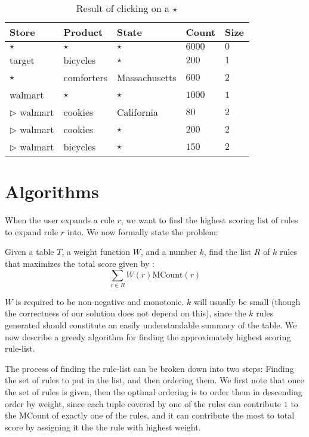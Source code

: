 \documentclass{sig-alternate}
\begin{document}
\begin{table}
\centering
\begin{tabular}{| l | l | l | l | l |}
\hline Store & Product & State & Count & Size \\
\hline
$\star$ & $\star$ & $\star$ & $6000$ & $0$ \\ \cline{1-5}
target & bicycles & $\star$ & $200$ & $1$ \\ \cline{1-5}
$\star$ & comforters & Massachusetts & $600$ & $2$ \\ \cline{1-5}
walmart & $\star$ & $\star$ & $1000$ & $1$ \\ \cline{2-5}
$\triangleright$ walmart & cookies & California & $80$ & $2$ \\ \cline{2-5}
$\triangleright$ walmart & cookies & $\star$ & $200$ & $2$ \\ \cline{2-5}
$\triangleright$ walmart & bicycles & $\star$ & $150$ & $2$ \\  \hline
\end{tabular}
\caption{Result of clicking on a $\star$ \label{table:introexample3}}
\end{table}

\section{Algorithms}
\label{sec:algorithms}
When the user expands a rule $r$, we want to find the highest scoring list of rules to expand rule $r$ into. We now formally state the problem:

Given a table $T$, a weight function $W$, and a number $k$, find the list $R$ of $k$ rules that maximizes the total score given by :
$$\sum_{r \in R}W(r)\text{MCount}(r)$$

$W$ is required to be non-negative and monotonic. $k$ will usually be small (though the correctness of our solution does not depend on this), since the $k$ rules generated should constitute an easily understandable summary of the table. We now describe a greedy algorithm for finding the approximately highest scoring rule-list.

The process of finding the rule-list can be broken down into two steps: Finding the set of rules to put in the list, and then ordering them. We first note that once the set of rules is given, then the optimal ordering is to order them in descending order by weight, since each tuple covered by one of the rules can contribute $1$ to the MCount of exactly one of the rules, and it can contribute the most to total score by assigning it the the rule with highest weight.
\end{document}
